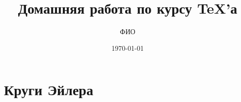 \documentclass{article}
\title{\bfseries Домашняя работа \textnumero 7 по курсу \TeX'а}
\author{ФИО}
\date{\today}
\begin{document}
  \maketitle
  \section{Круги Эйлера}
\end{document}
